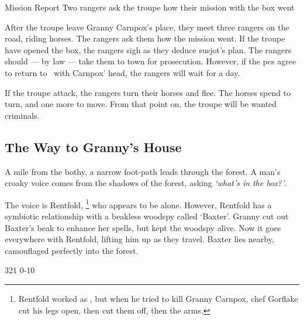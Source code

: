 \documentclass[10pt,twoside]{book}
\newcommand\carnBothy{}
\begin{document}
%
{Mission Report}%
{Two \glspl{ranger} ask the troupe how their mission with the box went}%


After the troupe leave Granny Carnpox's place, they meet three \glspl{ranger} on the road, riding horses.
The \glspl{ranger} ask them how the mission went.
If the troupe have opened the box, the \glspl{ranger} sigh as they deduce \gls{susjot}'s plan.
The \glspl{ranger} should --- by law --- take them to town for prosecution.
However, if the \glspl{pc} agree to return to \carnBothy\ with Carnpox' head, the \glspl{ranger} will wait for a day.

If the troupe attack, the \glspl{ranger} turn their horses and flee.
The horses spend  to turn, and one more to move.
From that point on, the troupe will be wanted criminals.

\subsection{The Way to Granny's House}

\vspace{-1em}
\begin{boxtext}
  A mile from the \gls{bothy}, a narrow foot-path leads through the forest.
  A man's croaky voice comes from the shadows of the forest, asking \textit{`what's in the box?'}.
\end{boxtext}

The voice is Rentfold,%
\footnote{Rentfold worked as , but when he tried to kill Granny Carnpox, chef Gorflake cut his legs open, then cut them off, then the arms.}
who appears to be alone.
However, Rentfold has a symbiotic relationship with a beakless \gls{woodspy} called `Baxter'.
Granny cut out Baxter's beak to enhance her \glspl{spell}, but kept the \gls{woodspy} alive.
Now it goes everywhere with Rentfold, lifting him up as they travel.
Baxter lies nearby, camouflaged perfectly into the forest.

%
  {{3}{2}{1}}%
  {{0}{-1}{0}}%
  {%
  }%
  {}%
  {}%
  {\tentacles}%
\end{document}
